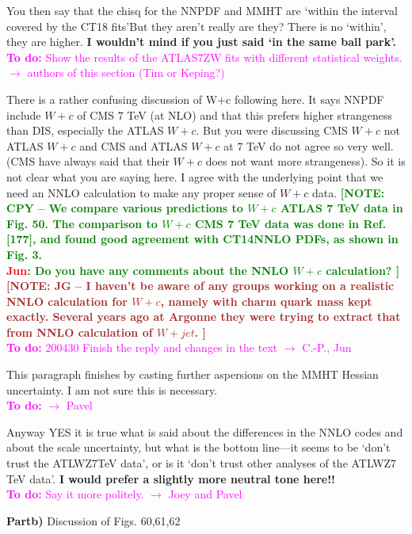 \documentclass[aps,prd,amsmath,nofootinbib,floatfix,fleqn]{revtex4}
\newcommand{\TODO}[1]{\textcolor{magenta}{
\quad\vspace{3pt} \\ {\bf To do:} #1 \\
}}
\newcommand{\NOTECPY}[1]{\textcolor{green}{ \bf[NOTE: CPY -- #1 ]}}
\newcommand{\NOTEJG}[1]{\textcolor{brown}{ \bf[NOTE: JG -- #1 ]}}
\begin{document}
\noindent
You then say that the chisq for the NNPDF and MMHT are ‘within the interval covered by the CT18 fits’But they aren’t really are they? There is no ‘within’, they are higher. {\bf I wouldn’t mind if you just said ‘in the same ball park’.}  
\TODO{Show the results of the ATLAS7ZW fits with different statistical weights. $\to$ authors of this section (Tim or Keping?)}

\noindent
There is a rather confusing discussion of W+c following here. It says NNPDF include $W+c$ of CMS
7 TeV (at NLO) and that this prefers higher strangeness than DIS, especially the ATLAS $W+c$.
But you were discussing CMS $W+c$ not ATLAS $W+c$ and CMS and ATLAS $W+c$ at 7 TeV do not agree
so very well. (CMS have always said that their $W+c$ does not want more strangeness). So it is not clear what you are saying here. I agree with the underlying point that we need an NNLO calculation to make any proper sense of $W+c$ data.  
\NOTECPY{We compare various predictions to $W+c$ ATLAS 7 TeV data in Fig. 50. The comparison to  $W+c$ CMS 7 TeV data was done in Ref. [177], and found good agreement with CT14NNLO PDFs, as shown in Fig. 3. 
\\ \textcolor{red}{Jun}: Do you have any comments about the NNLO $W+c$ calculation?}\\
\NOTEJG{I haven't be aware of any groups working on a realistic NNLO calculation for $W+c$, namely with charm quark mass kept exactly. Several years ago at Argonne they were trying to extract that from NNLO calculation of $W+jet$.}
\TODO{200430 Finish the reply and changes in the text $\to$ C.-P., Jun}


\noindent
This paragraph finishes by casting further aspersions on the MMHT Hessian uncertainty. I am not sure
this is necessary.  
\TODO{$\to$ Pavel}

\noindent
Anyway YES it is true what is said about the differences in the NNLO codes and about the scale
uncertainty, but what is the bottom line—it seems to be ‘don’t trust the ATLWZ7TeV data’, or is it
‘don’t trust other analyses of the ATLWZ7 TeV data’. {\bf I would prefer a slightly more neutral tone here!!}  
\TODO{Say it more politely. $\to$ Joey and Pavel}

{\bf Partb)}
Discussion of Figs. 60,61,62  \\
\end{document}
